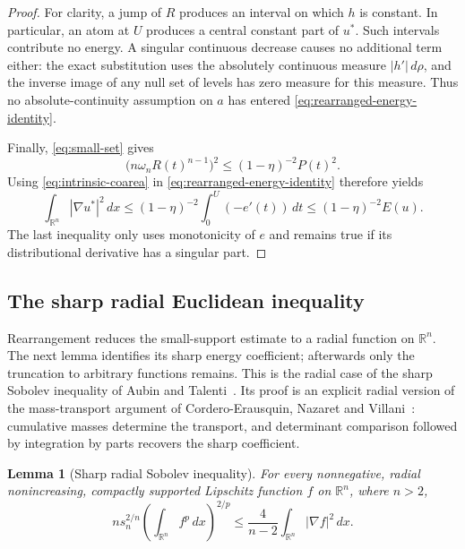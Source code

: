 \documentclass[11pt]{article}
\numberwithin{equation}{section}
\newtheorem{lemma}[theorem]{Lemma}
\theoremstyle{definition}
\theoremstyle{remark}
\begin{document}
\begin{proof}
For clarity, a jump of $R$ produces an interval on which $h$ is
constant.  In particular, an atom at $U$ produces a central constant
part of $u^*$.  Such intervals contribute no energy.  A singular
continuous decrease causes no additional term either: the exact
substitution uses the absolutely continuous measure
$|h'|\,d\rho$, and the inverse image of any null set of levels has
zero measure for this measure.  Thus no absolute-continuity
assumption on $a$ has entered
\eqref{eq:rearranged-energy-identity}.

Finally, \eqref{eq:small-set} gives
\[
 \bigl(n\omega_n R(t)^{n-1}\bigr)^2
       \le(1-\eta)^{-2}P(t)^2.
\]
Using \eqref{eq:intrinsic-coarea} in
\eqref{eq:rearranged-energy-identity} therefore yields
\[
 \int_{\mathbb R^n}|\nabla u^*|^2\,d x
   \le(1-\eta)^{-2}\int_0^U(-e'(t))\,d t
   \le(1-\eta)^{-2}E(u).
\]
The last inequality only uses monotonicity of $e$ and remains true
if its distributional derivative has a singular part.
\end{proof}

\subsection{The sharp radial Euclidean inequality}

Rearrangement reduces the small-support estimate to a radial function
on $\mathbb R^n$. The next lemma identifies its sharp energy coefficient;
afterwards only the truncation to arbitrary functions remains.
This is the radial case of the sharp Sobolev inequality of Aubin and
Talenti~\cite{Aubin1976,Talenti1976}. Its proof is an explicit radial
version of the mass-transport argument of Cordero-Erausquin, Nazaret and
Villani~\cite[Section~2]{CorderoNazaretVillani2004}: cumulative masses
determine the transport, and determinant comparison followed by
integration by parts recovers the sharp coefficient.

\begin{lemma}[Sharp radial Sobolev inequality]
\label{lem:radial-sobolev}
For every nonnegative, radial nonincreasing, compactly supported
Lipschitz function $f$ on $\mathbb R^n$, where $n>2$,
\begin{equation}
 ns_n^{2/n}
       \left(\int_{\mathbb R^n}f^p\,d x\right)^{2/p}
    \le \frac4{n-2}\int_{\mathbb R^n}|\nabla f|^2\,d x.
 \label{eq:radial-sobolev}
\end{equation}
\end{lemma}
\end{document}
